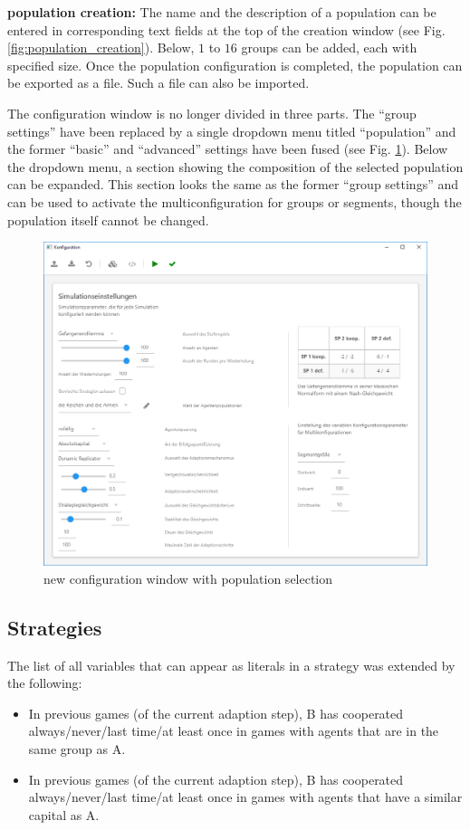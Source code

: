 \documentclass[parskip=full,11pt]{scrartcl}
\begin{document}
\textbf{population creation:}
The name and the description of a population can be entered in corresponding text fields at the top of the creation window (see Fig. \ref{fig:population_creation}). Below, \(1\) to \(16\) groups can be added, each with specified size. Once the population configuration is completed, the population can be exported as a file. Such a file can also be imported.

The configuration window is no longer divided in three parts. The \enquote{group settings} have been replaced by a single dropdown menu titled \enquote{population} and the former \enquote{basic} and \enquote{advanced} settings have been fused (see Fig. \ref{fig:new_config}). Below the dropdown menu, a section showing the composition of the selected population can be expanded. This section looks the same as the former \enquote{group settings} and can be used to activate the multiconfiguration for groups or segments, though the population itself cannot be changed.

\begin{figure}[h]
	\centering
	\includegraphics[width = \linewidth]{images/new_config.png}
	\caption{new configuration window with population selection}
	\label{fig:new_config}
\end{figure}

\subsection{Strategies}
The list of all variables that can appear as literals in a strategy was extended by the following:
\begin{itemize}
\item In previous games (of the current adaption step), B has cooperated always/never/last time/at least once in games with agents that are in the same group as A.
\item In previous games (of the current adaption step), B has cooperated always/never/last time/at least once in games with agents that have a similar capital as A.
\end{itemize}
\end{document}
